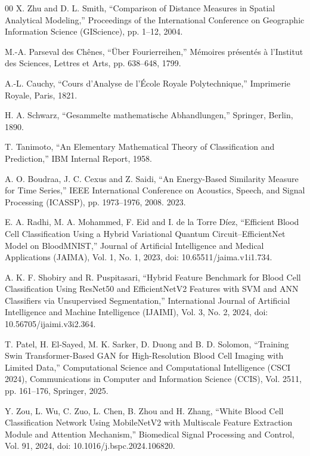 \documentclass[preprint,12pt]{elsarticle}
\begin{document}
\begin{thebibliography}{00}
X. Zhu and D. L. Smith,
``Comparison of Distance Measures in Spatial Analytical Modeling,''
Proceedings of the International Conference on Geographic Information Science (GIScience),
pp. 1--12, 2004.



M.-A. Parseval des Chênes,
``Über Fourierreihen,''
Mémoires présentés à l’Institut des Sciences, Lettres et Arts, 
pp. 638--648, 1799.


A.-L. Cauchy,
``Cours d’Analyse de l’École Royale Polytechnique,''
Imprimerie Royale, Paris, 1821.

H. A. Schwarz,
``Gesammelte mathematische Abhandlungen,''
Springer, Berlin, 1890.

T. Tanimoto,
``An Elementary Mathematical Theory of Classification and Prediction,''
IBM Internal Report, 1958.

A. O. Boudraa, J. C. Cexus and Z. Saidi,
``An Energy-Based Similarity Measure for Time Series,''
IEEE International Conference on Acoustics, Speech, and Signal Processing (ICASSP),
pp. 1973--1976, 2008.
2023.

E. A. Radhi, M. A. Mohammed, F. Eid and I. de la Torre Díez,
``Efficient Blood Cell Classification Using a Hybrid Variational Quantum Circuit–EfficientNet Model on BloodMNIST,''
Journal of Artificial Intelligence and Medical Applications (JAIMA),
Vol. 1, No. 1, 2023, doi: 10.65511/jaima.v1i1.734.

A. K. F. Shobiry and R. Puspitasari,
``Hybrid Feature Benchmark for Blood Cell Classification Using ResNet50 and EfficientNetV2 Features with SVM and ANN Classifiers via Unsupervised Segmentation,''
International Journal of Artificial Intelligence and Machine Intelligence (IJAIMI),
Vol. 3, No. 2, 2024, doi: 10.56705/ijaimi.v3i2.364.

T. Patel, H. El-Sayed, M. K. Sarker, D. Duong and B. D. Solomon,
``Training Swin Transformer-Based GAN for High-Resolution Blood Cell Imaging with Limited Data,''
Computational Science and Computational Intelligence (CSCI 2024),
Communications in Computer and Information Science (CCIS), Vol. 2511,
pp. 161--176, Springer, 2025. 

Y. Zou, L. Wu, C. Zuo, L. Chen, B. Zhou and H. Zhang,
``White Blood Cell Classification Network Using MobileNetV2 with Multiscale Feature Extraction Module and Attention Mechanism,''
Biomedical Signal Processing and Control,
Vol. 91, 2024, doi: 10.1016/j.bspc.2024.106820. 


\end{thebibliography}
\end{document}
